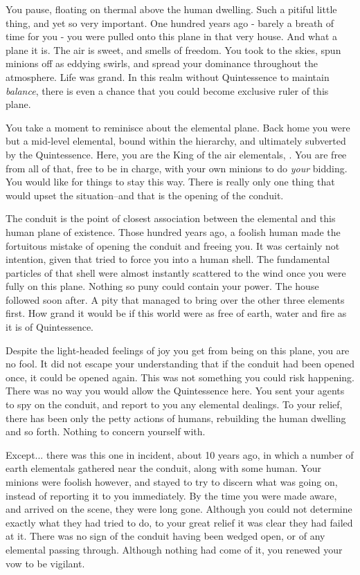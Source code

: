 \documentclass[char]{elementals}
\begin{document}
\name{\cKing{}}

You pause, floating on thermal above the human dwelling. Such a pitiful little thing, and yet so very important. One hundred years ago - barely a breath of time for you - you were pulled onto this plane in that very house. And what a plane it is. The air is sweet, and smells of freedom. You took to the skies, spun minions off as eddying swirls, and spread your dominance throughout the atmosphere.  Life was grand. In this realm without Quintessence to maintain \emph{balance}, there is even a chance that you could become exclusive ruler of this plane.

You take a moment to reminisce about the elemental plane. Back home you were but a mid-level elemental, bound within the hierarchy, and ultimately subverted by the Quintessence. Here, you are the King of the air elementals, \cKing{\intro}. You are free from all of that, free to be in charge, with your own minions to do \emph{your} bidding. You would like for things to stay this way. There is really only one thing that would upset the situation--and that is the opening of the conduit.

The conduit is the point of closest association between the elemental and this human plane of existence. Those hundred years ago, a foolish human made the fortuitous mistake of opening the conduit and freeing you. It was certainly not \cGrandfather{\their} intention, given that \cGrandfather{\they} tried to force you into a human shell. The fundamental particles of that shell were almost instantly scattered to the wind once you were fully on this plane. Nothing so puny could contain your power. The house  followed soon after. A pity that \cGrandfather{} managed to bring over the other three elements first. How grand it would be if this world were as free of earth, water and fire as it is of Quintessence.

Despite the  light-headed feelings of joy you get from being on this plane, you are no fool. It did not escape your understanding that if the conduit had been opened once, it could be opened again. This was not something you could risk happening. There was no way you would allow the Quintessence here. You sent your agents to spy on the conduit, and report to you any elemental dealings. To your relief, there has been only the petty actions of humans, rebuilding the human dwelling and so forth. Nothing to concern yourself with.

Except... there was this one in incident, about 10 years ago, in which a number of earth elementals gathered near the conduit, along with some human. Your minions were foolish however, and stayed to try to discern what was going on, instead of reporting it to you immediately. By the time you were made aware, and arrived on the scene, they were long gone. Although you could not determine exactly  what they had tried to do, to your great relief it was clear they had failed at it. There was no sign of the conduit having been wedged open, or of any elemental passing through. Although nothing had come of it, you renewed your vow to be vigilant.
\end{document}
